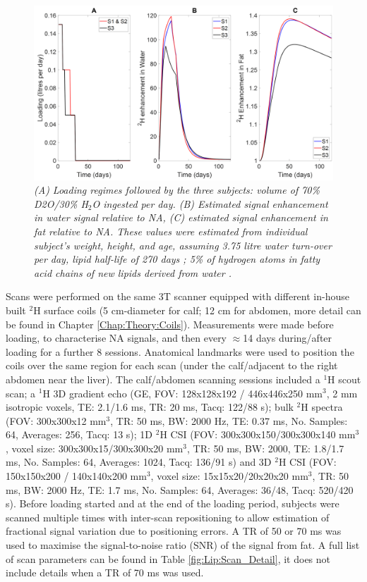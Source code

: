 \documentclass[class=article, crop=false]{standalone}
\begin{document}
\begin{figure}
    \centering
    \includegraphics[width=1\textwidth]{Figures/Lipid/Loading_Routine.png}
    \caption{\textit{(A) Loading regimes followed by the three subjects: volume of 70\% D2O/30\% H$_2$O ingested per day. (B) Estimated signal enhancement in water signal relative to NA, (C) estimated signal enhancement in fat relative to NA. These values were estimated from individual subject’s weight, height, and age, assuming 3.75 litre water turn-over per day, lipid half-life of 270 days \cite{Carnethon2002Serum19871998}; 5\% of hydrogen atoms in fatty acid chains of new lipids derived from water \cite{Turner2003MeasurementMIDA}.}}
    \label{fig:Lip:Load}
\end{figure}

Scans were performed on the same 3T scanner equipped with different in-house built $^2$H surface coils (5 cm-diameter for calf; 12 cm for abdomen, more detail can be found in Chapter \ref{Chap:Theory:Coils}). Measurements were made before loading, to characterise NA signals, and then every $\approx$14 days during/after loading for a further 8 sessions. Anatomical landmarks were used to position the coils over the same region for each scan (under the calf/adjacent to the right abdomen near the liver). The calf/abdomen scanning sessions included a $^1$H scout scan; a $^1$H 3D gradient echo (GE, FOV: 128x128x192 / 446x446x250 mm$^3$, 2 mm isotropic voxels, TE: 2.1/1.6 ms, TR: 20 ms, Tacq: 122/88 s); bulk $^2$H spectra (FOV: 300x300x12 mm$^3$, TR: 50 ms, BW: 2000 Hz, TE: 0.37 ms, No. Samples: 64, Averages: 256, Tacq: 13 s); 1D $^2$H CSI (FOV: 300x300x150/300x300x140 mm$^3$, voxel size: 300x300x15/300x300x20 mm$^3$, TR: 50 ms, BW: 2000, TE: 1.8/1.7 ms, No. Samples: 64, Averages: 1024, Tacq: 136/91 s) and 3D $^2$H CSI (FOV: 150x150x200 / 140x140x200 mm$^3$, voxel size: 15x15x20/20x20x20 mm$^3$, TR: 50 ms, BW: 2000 Hz, TE: 1.7 ms, No. Samples: 64, Averages: 36/48, Tacq: 520/420 s). Before loading started and at the end of the loading period, subjects were scanned multiple times with inter-scan repositioning to allow estimation of fractional signal variation due to positioning errors. A TR of 50 or 70 ms was used to maximise the signal-to-noise ratio (SNR) of the signal from fat. A full list of scan parameters can be found in Table \ref{fig:Lip:Scan_Detail}, it does not include details when a TR of 70 ms was used.
\end{document}
